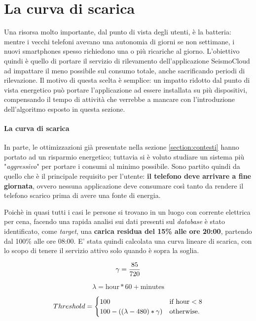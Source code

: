 \documentclass[a4paper,10pt]{memoir}
\begin{document}
\section{La curva di scarica}
\label{section:batteria}

Una risorsa molto importante, dal punto di vista degli utenti, è la batteria: mentre i vecchi telefoni avevano una autonomia di giorni se non settimane, i nuovi smartphones spesso richiedono una o più ricariche al giorno. L'obiettivo quindi è quello di portare il servizio di rilevamento dell'applicazione SeismoCloud ad impattare il meno possibile sul consumo totale, anche sacrificando periodi di rilevazione. Il motivo di questa scelta è semplice: un impatto ridotto dal punto di vista energetico può portare l'applicazione ad essere installata su più dispositivi, compensando il tempo di attività che verrebbe a mancare con l'introduzione dell'algoritmo esposto in questa sezione.

\paragraph{La curva di scarica} In parte, le ottimizzazioni già presentate nella sezione \ref{section:contesti} hanno portato ad un risparmio energetico; tuttavia si è voluto studiare un sistema più "\textit{aggressivo}" per portare i consumi al minimo possibile. Sono partito quindi da quello che è il principale requisito per l'utente: \textbf{il telefono deve arrivare a fine giornata}, ovvero nessuna applicazione deve consumare così tanto da rendere il telefono scarico prima di avere una fonte di energia.

Poichè in quasi tutti i casi le persone si trovano in un luogo con corrente elettrica per cena, facendo una rapida analisi sui dati presenti sul \textit{database} è stato identificato, come \textit{target}, una \textbf{carica residua del 15\% alle ore 20:00}, partendo dal 100\% alle ore 08:00. E' stata quindi calcolata una curva lineare di scarica, con lo scopo di tenere il servizio attivo solo quando è sopra la soglia.

\begin{equation}
\gamma = {85 \over 720}
\end{equation}

\begin{equation}
\lambda = \text{hour} * 60 + \text{minutes}
\end{equation}

\begin{equation}
	\\
    Threshold =
    \begin{cases}
        100 & \text{if hour} < 8\\
        {100 - ((\lambda - 480) * \gamma)} & \text{otherwise.}
    \end{cases}
\end{equation}
\end{document}
